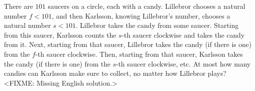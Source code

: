 \problem
There are $101$ saucers on a circle, each with a candy.
Lillebror chooses a natural number $f < 101$, and then Karlsson, knowing
Lillebror's number, chooses a natural number $s < 101$.
Lillebror takes the candy from some saucer.
Starting from this saucer, Karlsson counts the $s$-th saucer clockwise and
takes the candy from it.
Next, starting from that saucer, Lillebror takes the candy (if there is one)
from the $f$-th saucer clockwise.
Then, starting from that saucer, Karlsson takes the candy (if there is one)
from the $s$-th saucer clockwise, etc.
At most how many candies can Karlsson make sure to collect, no matter how
Lillebror plays?
\solution
<FIXME: Missing English solution.>
\endproblem
